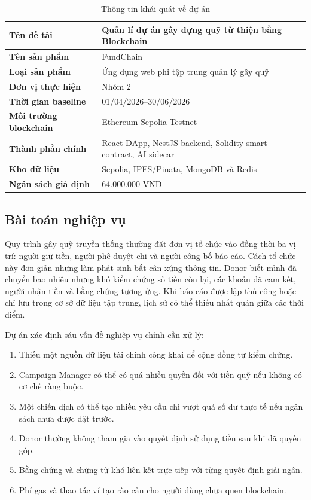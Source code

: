 \begin{table}[H]
\centering
\caption{Thông tin khái quát về dự án}
\label{tab:project-overview}
\begin{tabularx}{\textwidth}{| >{\bfseries}p{4.2cm} | X |}
\hline
Tên đề tài & Quản lí dự án gây dựng quỹ từ thiện bằng Blockchain \\ \hline
Tên sản phẩm & FundChain \\ \hline
Loại sản phẩm & Ứng dụng web phi tập trung quản lý gây quỹ \\ \hline
Đơn vị thực hiện & Nhóm 2 \\ \hline
Thời gian baseline & 01/04/2026--30/06/2026 \\ \hline
Môi trường blockchain & Ethereum Sepolia Testnet \\ \hline
Thành phần chính & React DApp, NestJS backend, Solidity smart contract, AI sidecar \\ \hline
Kho dữ liệu & Sepolia, IPFS/Pinata, MongoDB và Redis \\ \hline
Ngân sách giả định & 64.000.000 VNĐ \\
\hline
\end{tabularx}
\end{table}

\subsection{Bài toán nghiệp vụ}

Quy trình gây quỹ truyền thống thường đặt đơn vị tổ chức vào đồng thời ba vị trí: người giữ tiền, người phê duyệt chi và người công bố báo cáo. Cách tổ chức này đơn giản nhưng làm phát sinh bất cân xứng thông tin. Donor biết mình đã chuyển bao nhiêu nhưng khó kiểm chứng số tiền còn lại, các khoản đã cam kết, người nhận tiền và bằng chứng tương ứng. Khi báo cáo được lập thủ công hoặc chỉ lưu trong cơ sở dữ liệu tập trung, lịch sử có thể thiếu nhất quán giữa các thời điểm.

Dự án xác định sáu vấn đề nghiệp vụ chính cần xử lý:

\begin{enumerate}
  \item Thiếu một nguồn dữ liệu tài chính công khai để cộng đồng tự kiểm chứng.
  \item Campaign Manager có thể có quá nhiều quyền đối với tiền quỹ nếu không có cơ chế ràng buộc.
  \item Một chiến dịch có thể tạo nhiều yêu cầu chi vượt quá số dư thực tế nếu ngân sách chưa được đặt trước.
  \item Donor thường không tham gia vào quyết định sử dụng tiền sau khi đã quyên góp.
  \item Bằng chứng và chứng từ khó liên kết trực tiếp với từng quyết định giải ngân.
  \item Phí gas và thao tác ví tạo rào cản cho người dùng chưa quen blockchain.
\end{enumerate}

